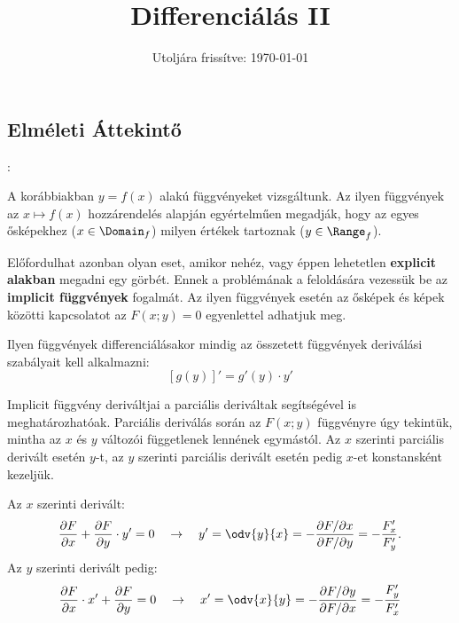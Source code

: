 \documentclass[a4paper, 12pt]{scrartcl}
\title{Differenciálás II}
\date{Utoljára frissítve: \today}
\begin{document}
\maketitle

\subsection{Elméleti Áttekintő}

\begin{blueBox}
  :

  A korábbiakban $y = f(x)$ alakú függvényeket vizsgáltunk. Az ilyen függvények
  az $x \mapsto f(x)$ hozzárendelés alapján egyértelműen megadják, hogy az egyes
  ősképekhez ($x \in \Domain_f$) milyen értékek tartoznak ($y \in \Range_f$).

  Előfordulhat azonban olyan eset, amikor nehéz, vagy éppen lehetetlen
  \textbf{explicit alakban} megadni egy görbét. Ennek a problémának a
  feloldására vezessük be az \textbf{implicit függvények} fogalmát. Az ilyen
  függvények esetén az ősképek és képek közötti kapcsolatot az $F(x; y) = 0$
  egyenlettel adhatjuk meg.

  Ilyen függvények differenciálásakor mindig az összetett függvények deriválási
  szabályait kell alkalmazni:
  \[
    \left[ g(y) \right]' = g'(y) \cdot y'
  \]
\end{blueBox}

\begin{note}
  Implicit függvény deriváltjai a parciális deriváltak segítségével is
  meghatározhatóak. Parciális deriválás során az $F(x;y)$ függvényre úgy
  tekintük, mintha az $x$ és $y$ változói függetlenek lennének egymástól. Az
  $x$ szerinti parciális derivált esetén $y$-t, az $y$ szerinti parciális
  derivált esetén pedig $x$-et konstansként kezeljük.

  Az $x$ szerinti derivált:
  \[
    \frac{\partial F}{\partial x} + \frac{\partial F}{\partial y} \cdot y' = 0
    \quad \rightarrow \quad
    y'
    = \odv{y}{x}
    = -\frac{\partial F / \partial x}{\partial F / \partial y}
    = -\frac{F'_x}{F'_y}
    \text.
  \]
  Az $y$ szerinti derivált pedig:
  \[
    \frac{\partial F}{\partial x} \cdot x' + \frac{\partial F}{\partial y} = 0
    \quad \rightarrow \quad
    x'
    = \odv{x}{y}
    = -\frac{\partial F / \partial y}{\partial F / \partial x}
    = -\frac{F'_y}{F'_x}
  \]
\end{note}
\end{document}
